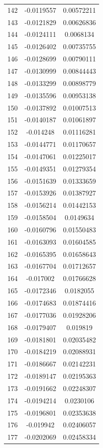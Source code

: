 \documentclass[a4paper, 11pt, oneside]{report}
\begin{document}
{\begin{longtable}{|c|c|c|}
142 & -0.0119557 & 0.00572211 \\
143 & -0.0121829 & 0.00626836 \\
144 & -0.0124111 & 0.0068134  \\
145 & -0.0126402 & 0.00735755 \\
146 & -0.0128699 & 0.00790111 \\
147 & -0.0130999 & 0.00844443 \\
148 & -0.0133299 & 0.00898779 \\
149 & -0.0135596 & 0.00953138 \\
150 & -0.0137892 & 0.01007513 \\
151 & -0.0140187 & 0.01061897 \\
152 & -0.014248  & 0.01116281 \\
153 & -0.0144771 & 0.01170657 \\
154 & -0.0147061 & 0.01225017 \\
155 & -0.0149351 & 0.01279354 \\
156 & -0.0151639 & 0.01333659 \\
157 & -0.0153926 & 0.01387927 \\
158 & -0.0156214 & 0.01442153 \\
159 & -0.0158504 & 0.0149634  \\
160 & -0.0160796 & 0.01550483 \\
161 & -0.0163093 & 0.01604585 \\
162 & -0.0165395 & 0.01658643 \\
163 & -0.0167704 & 0.01712657 \\
164 & -0.017002  & 0.01766628 \\
165 & -0.0172346 & 0.0182055  \\
166 & -0.0174683 & 0.01874416 \\
167 & -0.0177036 & 0.01928206 \\
168 & -0.0179407 & 0.019819   \\
169 & -0.0181801 & 0.02035482 \\
170 & -0.0184219 & 0.02088931 \\
171 & -0.0186667 & 0.02142231 \\
172 & -0.0189147 & 0.02195363 \\
173 & -0.0191662 & 0.02248307 \\
174 & -0.0194214 & 0.0230106  \\
175 & -0.0196801 & 0.02353638 \\
176 & -0.019942  & 0.02406057 \\
177 & -0.0202069 & 0.02458334 \\

\end{longtable}}
\end{document}
